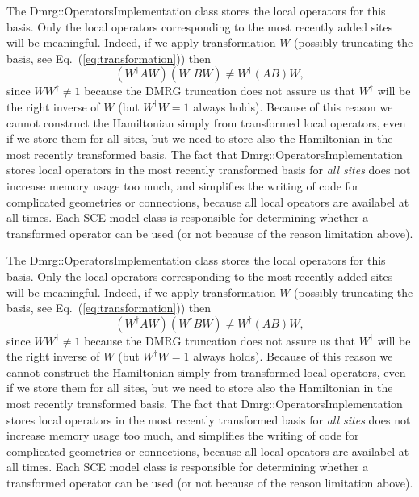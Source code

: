 \documentclass[paper=letter]{scrartcl}
\newcommand{\cppClass}[1]{{\sffamily #1}}
\begin{document}
The \cppClass{Dmrg::OperatorsImplementation} class stores the local operators for this basis. Only the local operators corresponding to the most recently added sites will be meaningful. Indeed, if we apply transformation $W$ (possibly truncating the basis, see Eq.~(\ref{eq:transformation})) then \begin{equation} (W^\dagger A W) (W^\dagger BW) \neq W^\dagger (AB) W, \end{equation} since $WW^\dagger\neq 1$ because the DMRG truncation does not assure us that $W^\dagger$ will be the right inverse of $W$ (but $W^\dagger W=1$ always holds). Because of this reason we cannot construct the Hamiltonian simply from transformed local operators, even if we store them for all sites, but we need to store also the Hamiltonian in the most recently transformed basis. The fact that \cppClass{Dmrg::OperatorsImplementation} stores local operators in the most recently transformed basis for \emph{all sites} does not increase memory usage too much, and simplifies the writing of code for complicated geometries or connections, because all local opeators are availabel at all times. Each SCE model class is responsible for determining whether a transformed operator can be used (or not because of the reason limitation above).

The \cppClass{Dmrg::OperatorsImplementation} class stores the local operators for this basis. Only the local operators corresponding to the most recently added sites will be meaningful. Indeed, if we apply transformation $W$ (possibly truncating the basis, see Eq.~(\ref{eq:transformation})) then \begin{equation} (W^\dagger A W) (W^\dagger BW) \neq W^\dagger (AB) W, \end{equation} since $WW^\dagger\neq 1$ because the DMRG truncation does not assure us that $W^\dagger$ will be the right inverse of $W$ (but $W^\dagger W=1$ always holds). Because of this reason we cannot construct the Hamiltonian simply from transformed local operators, even if we store them for all sites, but we need to store also the Hamiltonian in the most recently transformed basis. The fact that \cppClass{Dmrg::OperatorsImplementation} stores local operators in the most recently transformed basis for \emph{all sites} does not increase memory usage too much, and simplifies the writing of code for complicated geometries or connections, because all local opeators are availabel at all times. Each SCE model class is responsible for determining whether a transformed operator can be used (or not because of the reason limitation above).
\end{document}
